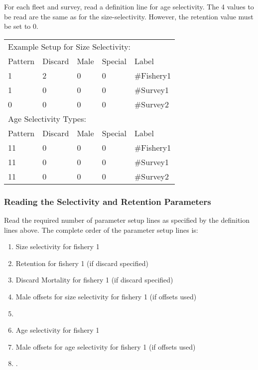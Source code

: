 For each fleet and survey, read a definition line for age selectivity.  The 4 values to be read are the same as for the size-selectivity.  However, the retention value must be set to 0.

\begin{center}
	\begin{longtable}{p{2cm} p{2cm} p{2cm} p{2cm} p{6.5cm} }
		\hline
		\multicolumn{5}{l}{Example Setup for Size Selectivity:}\Tstrut\\
		Pattern & Discard & Male & Special & Label \Bstrut\\
		\hline
		1  & 2 & 0 & 0 & \#Fishery1\Tstrut\\
		1  & 0 & 0 & 0 & \#Survey1\\
		0  & 0 & 0 & 0 & \#Survey2\Bstrut\\
		\hline

		\multicolumn{5}{l}{Age Selectivity Types:}\Tstrut\\
		Pattern & Discard & Male & Special & Label \Bstrut\\
		\hline
		11  & 0 & 0 & 0 & \#Fishery1\Tstrut\\
		11  & 0 & 0 & 0 & \#Survey1\\
		11  & 0 & 0 & 0 & \#Survey2\Bstrut\\
		\hline
	\end{longtable}
\end{center}

\subsubsection{Reading the Selectivity and Retention Parameters}
Read the required number of parameter setup lines as specified by the definition lines above.  The complete order of the parameter setup lines is:
\begin{enumerate}
	\item Size selectivity for fishery 1
	\item Retention for fishery 1 (if discard specified)
	\item Discard Mortality for fishery 1 (if discard specified)
	\item Male offsets for size selectivity for fishery 1 (if offsets used)
	\item <repeat for additional fleets and surveys>
	\item Age selectivity for fishery 1
	\item Male offsets for age selectivity for fishery 1 (if offsets used)
	\item <repeat for additional fleets and surveys>.
\end{enumerate}


